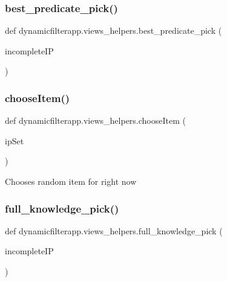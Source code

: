 \subsubsection{\texorpdfstring{best\+\_\+predicate\+\_\+pick()}{best\_predicate\_pick()}}
{\footnotesize\ttfamily def dynamicfilterapp.\+views\+\_\+helpers.\+best\+\_\+predicate\+\_\+pick (\begin{DoxyParamCaption}\item[{}]{incomplete\+IP }\end{DoxyParamCaption})}

\mbox{\label{namespacedynamicfilterapp_1_1views__helpers_ad1a6f030776f2f8bcaae48a4dda40665}} 
\subsubsection{\texorpdfstring{choose\+Item()}{chooseItem()}}
{\footnotesize\ttfamily def dynamicfilterapp.\+views\+\_\+helpers.\+choose\+Item (\begin{DoxyParamCaption}\item[{}]{ip\+Set }\end{DoxyParamCaption})}

\begin{DoxyVerb}Chooses random item for right now
\end{DoxyVerb}
 \mbox{\label{namespacedynamicfilterapp_1_1views__helpers_a19a0b5e8e5ce5def8165fcd0558ca88d}} 
\subsubsection{\texorpdfstring{full\+\_\+knowledge\+\_\+pick()}{full\_knowledge\_pick()}}
{\footnotesize\ttfamily def dynamicfilterapp.\+views\+\_\+helpers.\+full\+\_\+knowledge\+\_\+pick (\begin{DoxyParamCaption}\item[{}]{incomplete\+IP }\end{DoxyParamCaption})}


